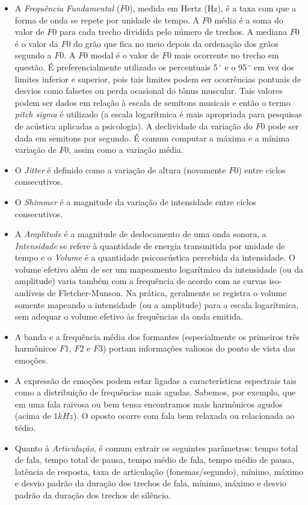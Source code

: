 \documentclass[12pt]{article}
\begin{document}
\begin{itemize}
\item A \emph{Frequência Fundamental} ($F0$), medida em Hertz (Hz), é a taxa com que a forma de onda se repete por unidade de tempo. A $F0$ média é a soma do valor de $F0$ para cada trecho dividida pelo número de trechos. A mediana $F0$ é o valor da $F0$ do grão que fica no meio depois da ordenação dos grãos segundo a $F0$. A $F0$ modal é o valor de $F0$ mais ocorrente no trecho em questão. É preferencialmente utilizado os percentuais 5$\,^{\circ}$ e o 95$\,^{\circ}$ em vez dos limites inferior e superior, pois tais limites podem ser ocorrências pontuais de desvios como falsetes ou perda ocasional do tônus muscular. Tais valores podem ser dados em relação à escala de semitons musicais e então o termo \emph{pitch sigma} é utilizado (a escala logarítmica é mais apropriada para pesquisas de acústica aplicadas a psicologia). A declividade da variação do $F0$ pode ser dada em semitons por segundo. É comum computar a máxima e a mínima variação de $F0$, assim como a variação média.

\item O \emph{Jitter} é definido como a variação de altura (novamente $F0$) entre ciclos consecutivos.

\item O \emph{Shimmer} é a magnitude da variação de intensidade entre ciclos consecutivos.

\item A \emph{Amplitude} é a magnitude de deslocamento de uma onda sonora, a \emph{Intensidade} se refere à quantidade de energia transmitida por unidade de tempo e o \emph{Volume} é a quantidade psicoacústica percebida da intensidade. O volume efetivo além de ser um mapeamento logarítmico da intensidade (ou da amplitude) varia também com a frequência de acordo com as curvas iso-audíveis de Fletcher-Munson. Na prática, geralmente se registra o volume somente mapeando a intensidade (ou a amplitude) para a escala logarítmica, sem adequar o volume efetivo às frequências da onda emitida.

\item A banda e a frequência média dos formantes (especialmente os primeiros três harmônicos $F1$, $F2$ e $F3$) portam informações valiosas do ponto de vista das emoções.

\item A expressão de emoções podem estar ligadas a características espectrais tais como a distribuição de frequências mais agudas. Sabemos, por exemplo, que em uma fala raivosa ou bem tensa encontramos mais harmônicos agudos (acima de $1kHz$). O oposto ocorre com fala bem relaxada ou relacionada ao tédio.

\item Quanto à \emph{Articulação}, é comum extrair os seguintes parâmetros: tempo total de fala, tempo total de pausa, tempo médio de fala, tempo médio de pausa, latência de resposta, taxa de articulação (fonemas/segundo), mínimo, máximo e desvio padrão da duração dos trechos de fala, mínimo, máximo e desvio padrão da duração dos trechos de silêncio.
\end{itemize}
\end{document}
